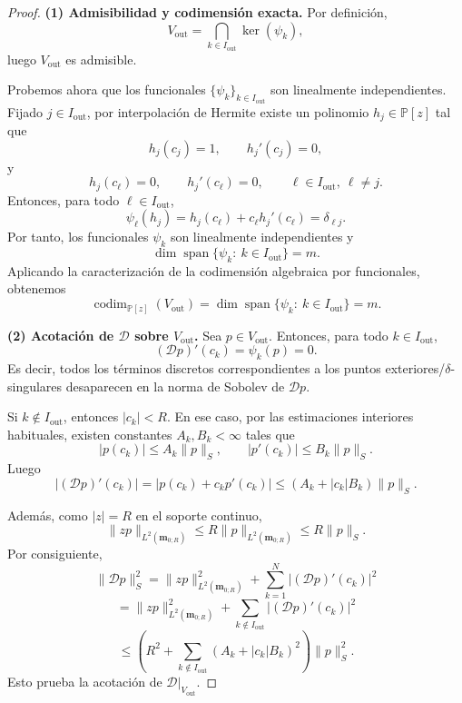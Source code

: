 \documentclass[12pt,a4paper]{article}
\theoremstyle{definition}
\theoremstyle{remark}
\newcommand{\Poly}{\mathbb{P}[z]}
\newcommand{\D}{\mathcal{D}}
\begin{document}
\begin{proof}
  \textbf{(1) Admisibilidad y codimensión exacta.}
  Por definición,
  \[
    V_{\mathrm{out}}=\bigcap_{k\in I_{\mathrm{out}}}\ker(\psi_k),
  \]
  luego $V_{\mathrm{out}}$ es admisible.

  Probemos ahora que los funcionales $\{\psi_k\}_{k\in I_{\mathrm{out}}}$ son linealmente
  independientes. Fijado $j\in I_{\mathrm{out}}$, por interpolación de Hermite existe un
  polinomio $h_j\in\Poly$ tal que
  \[
    h_j(c_j)=1,\qquad h_j'(c_j)=0,
  \]
  y
  \[
    h_j(c_\ell)=0,\qquad h_j'(c_\ell)=0,
    \qquad \ell\in I_{\mathrm{out}},\ \ell\neq j.
  \]
  Entonces, para todo $\ell\in I_{\mathrm{out}}$,
  \[
    \psi_\ell(h_j)=h_j(c_\ell)+c_\ell h_j'(c_\ell)=\delta_{\ell j}.
  \]
  Por tanto, los funcionales $\psi_k$ son linealmente independientes y
  \[
    \dim\operatorname{span}\{\psi_k:\ k\in I_{\mathrm{out}}\}=m.
  \]
  Aplicando la caracterización de la codimensión algebraica por funcionales, obtenemos
  \[
    \operatorname{codim}_{\Poly}(V_{\mathrm{out}})
    =
    \dim\operatorname{span}\{\psi_k:\ k\in I_{\mathrm{out}}\}
    =
    m.
  \]

  \medskip
  \textbf{(2) Acotación de $\D$ sobre $V_{\mathrm{out}}$.}
  Sea $p\in V_{\mathrm{out}}$. Entonces, para todo $k\in I_{\mathrm{out}}$,
  \[
    (\D p)'(c_k)=\psi_k(p)=0.
  \]
  Es decir, todos los términos discretos correspondientes a los puntos exteriores/$\delta$-singulares
  desaparecen en la norma de Sobolev de $\D p$.

  Si $k\notin I_{\mathrm{out}}$, entonces $|c_k|<R$. En ese caso, por las estimaciones
  interiores habituales, existen constantes $A_k,B_k<\infty$ tales que
  \[
    |p(c_k)|\le A_k\|p\|_S,
    \qquad
    |p'(c_k)|\le B_k\|p\|_S.
  \]
  Luego
  \[
    |(\D p)'(c_k)|
    =
    |p(c_k)+c_kp'(c_k)|
    \le
    (A_k+|c_k|B_k)\|p\|_S.
  \]

  Además, como $|z|=R$ en el soporte continuo,
  \[
    \|zp\|_{L^2(\mathbf{m}_{0;R})}\le R\|p\|_{L^2(\mathbf{m}_{0;R})}\le R\|p\|_S.
  \]
  Por consiguiente,
  \[
    \|\D p\|_S^2
    =
    \|zp\|_{L^2(\mathbf{m}_{0;R})}^2
    +
    \sum_{k=1}^N |(\D p)'(c_k)|^2
  \]
  \[
    =
    \|zp\|_{L^2(\mathbf{m}_{0;R})}^2
    +
    \sum_{k\notin I_{\mathrm{out}}} |(\D p)'(c_k)|^2
  \]
  \[
    \le
    \left(
    R^2+\sum_{k\notin I_{\mathrm{out}}}(A_k+|c_k|B_k)^2
    \right)\|p\|_S^2.
  \]
  Esto prueba la acotación de $\D|_{V_{\mathrm{out}}}$.


\end{proof}
\end{document}
